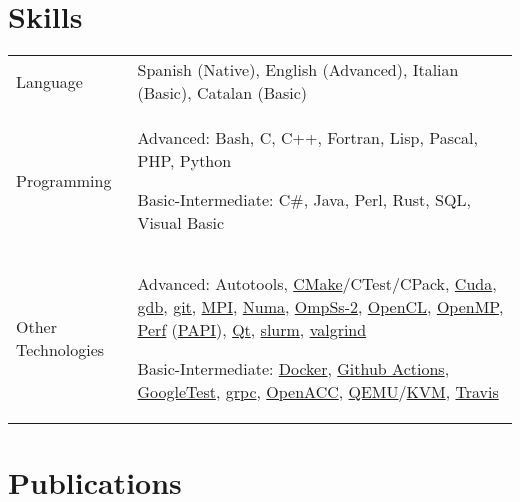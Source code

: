 \documentclass[a4paper,11pt]{article}
\begin{document}
\section{Skills}
\begin{tabularx}{\linewidth}{@{}l X@{}}
  Language & Spanish (Native), English (Advanced), Italian (Basic), Catalan (Basic)\\
  Programming & Advanced: Bash, C, C++, Fortran, Lisp, Pascal, PHP, Python

                Basic-Intermediate: C\#, Java, Perl, Rust, SQL, Visual Basic  \\

  Other Technologies & Advanced:
                       Autotools,
                       \href{https://cmake.org/}{CMake}/CTest/CPack,
                       \href{https://developer.nvidia.com/cuda-zone}{Cuda},
                       \href{https://www.sourceware.org/gdb/}{gdb},
                       \href{https://git-scm.com/}{git},
                       \href{https://www.mpi-forum.org/}{MPI},
                       \href{https://www.kernel.org/doc/html/v4.19/vm/numa.html}{Numa},
                       \href{https://pm.bsc.es/ompss-2}{OmpSs-2},
                       \href{https://www.khronos.org/api/opencl}{OpenCL},
                       \href{https://www.openmp.org/}{OpenMP},
                       \href{https://perf.wiki.kernel.org/index.php/Main_Page}{Perf} (\href{https://icl.utk.edu/papi/}{PAPI}),
                       \href{https://www.qt.io/}{Qt},
                       \href{https://slurm.schedmd.com/}{slurm},
                       \href{https://valgrind.org/}{valgrind}

                       Basic-Intermediate:
                       \href{https://www.docker.com/}{Docker},
                       \href{https://github.com/features/actions}{Github Actions},
                       \href{https://google.github.io/googletest/}{GoogleTest},
                       \href{https://grpc.io/}{grpc},
                       \href{https://www.openacc.org/}{OpenACC},
                       \href{https://www.qemu.org/}{QEMU}/\href{https://www.linux-kvm.org/page/Main_Page}{KVM},
                       \href{https://www.travis-ci.com/}{Travis} \\
\end{tabularx}

\section{Publications}
\begin{refsection}
    \nocite{*}
    \printbibliography[heading=none]
\end{refsection}


\vfill
{}
\end{document}
